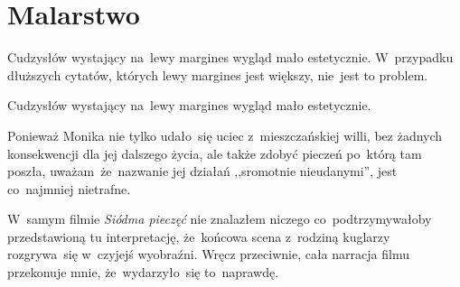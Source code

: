 \documentclass[a4paper,11pt]{article}
\begin{document}










\newpage

\section{Malarstwo}

\vspace{\spaceTwo}







\start {} Cudzysłów wystający na~lewy margines wygląd mało
estetycznie. W~przypadku dłuższych cytatów, których lewy margines jest
większy, nie~jest to problem.

\vspace{\spaceFour}



\start {} Cudzysłów wystający na~lewy margines wygląd mało
estetycznie.

\vspace{\spaceFour}



\start {} Ponieważ Monika nie tylko udało~się uciec
z~mieszczańskiej willi, bez żadnych konsekwencji dla jej dalszego
życia, ale także zdobyć pieczeń po~którą tam poszła,
uważam~że~nazwanie jej działań ,,sromotnie nieudanymi'', jest
co~najmniej nietrafne.

\vspace{\spaceFour}



\start {} W~samym filmie \textit{Siódma pieczęć} nie znalazłem
niczego co~podtrzymywałoby przedstawioną tu interpretację,
że~końcowa scena z~rodziną kuglarzy rozgrywa~się w~czyjejś
wyobraźni. Wręcz przeciwnie, cała narracja filmu przekonuje mnie,
że~wydarzyło~się to~naprawdę.

\vspace{\spaceFour}
\end{document}
